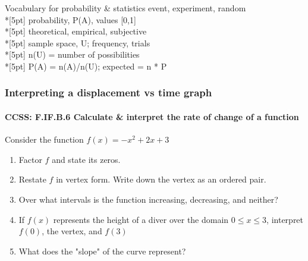 \documentclass{beamer}
\begin{document}
\begin{frame}{Vocabulary for probability \& statistics}
    event, experiment, random\\*[5pt]
    probability, P(A), values [0,1]\\*[5pt]
    theoretical, empirical, subjective\\*[5pt]
    sample space, U; frequency, trials\\*[5pt]
    n(U) = number of possibilities\\*[5pt]
    P(A) = n(A)/n(U); expected = n * P
\end{frame}

\frame
{
  \frametitle{Interpreting a displacement vs time graph}
  \framesubtitle{CCSS: F.IF.B.6 Calculate \& interpret the rate of change of a function}

  \begin{block}{Consider the function $f(x)=-x^2+2x+3$}
  \begin{enumerate}
      \item Factor $f$ and state its zeros.
      \item Restate $f$ in vertex form. Write down the vertex as an ordered pair.
      \item Over what intervals is the function increasing, decreasing, and neither?
      \item If $f(x)$ represents the height of a diver over the domain $0 \leq x \leq 3$, interpret $f(0)$, the vertex, and $f(3)$
      \item What does the "slope" of the curve represent?
  \end{enumerate}
  \end{block}
}
\end{document}
